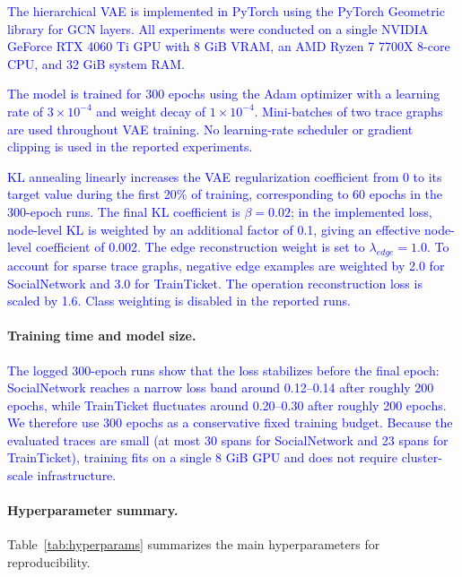 \documentclass[sigconf,review]{acmart}
\begin{document}
\textcolor{blue}{The hierarchical VAE is implemented in PyTorch using the PyTorch Geometric library for GCN layers. All experiments were conducted on a single NVIDIA GeForce RTX 4060 Ti GPU with 8 GiB VRAM, an AMD Ryzen 7 7700X 8-core CPU, and 32 GiB system RAM.}

\textcolor{blue}{
The model is trained for 300 epochs using the Adam optimizer with a learning rate of $3\times10^{-4}$ and weight decay of $1\times10^{-4}$. Mini-batches of two trace graphs are used throughout VAE training. No learning-rate scheduler or gradient clipping is used in the reported experiments.}

\textcolor{blue}{KL annealing linearly increases the VAE regularization coefficient from 0 to its target value during the first 20\% of training, corresponding to 60 epochs in the 300-epoch runs. The final KL coefficient is $\beta=0.02$; in the implemented loss, node-level KL is weighted by an additional factor of 0.1, giving an effective node-level coefficient of 0.002. The edge reconstruction weight is set to $\lambda_{edge}=1.0$. To account for sparse trace graphs, negative edge examples are weighted by 2.0 for SocialNetwork and 3.0 for TrainTicket. The operation reconstruction loss is scaled by 1.6. Class weighting is disabled in the reported runs.}

\paragraph{Training time and model size.}
\textcolor{blue}{
The logged 300-epoch runs show that the loss stabilizes before the final epoch: SocialNetwork reaches a narrow loss band around 0.12--0.14 after roughly 200 epochs, while TrainTicket fluctuates around 0.20--0.30 after roughly 200 epochs. We therefore use 300 epochs as a conservative fixed training budget. Because the evaluated traces are small (at most 30 spans for SocialNetwork and 23 spans for TrainTicket), training fits on a single 8 GiB GPU and does not require cluster-scale infrastructure.}

\paragraph{Hyperparameter summary.}
Table~\ref{tab:hyperparams} summarizes the main hyperparameters for reproducibility.
\end{document}

